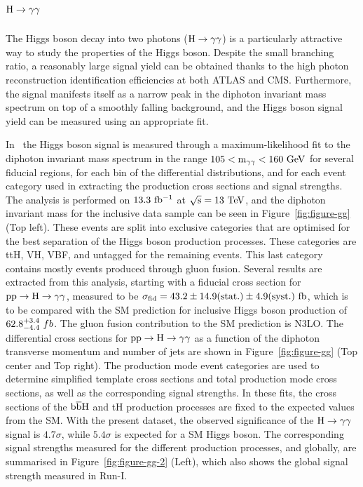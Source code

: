 \documentclass[10pt]{article}
\begin{document}
\section{\boldmath ${\rm H}\to\gamma\gamma$}

The Higgs boson decay into two photons (${\rm H\to\gamma\gamma}$) is a
particularly attractive way to study the properties of the Higgs boson. Despite
the small branching ratio, a reasonably large signal yield can be obtained thanks
to the high photon reconstruction identification efficiencies at both ATLAS and
CMS. Furthermore, the signal manifests itself as a narrow peak in the diphoton
invariant mass spectrum on top of a smoothly falling background, and the Higgs
boson signal yield can be measured using an appropriate fit.

In~\cite{ATLAS-gg} the Higgs boson signal is measured through a
maximum-likelihood fit to the diphoton invariant mass spectrum in the range
${\rm 105 < m_{\gamma\gamma} < 160~GeV}$ for several fiducial regions, for
each bin of the differential distributions, and for each event category used
in extracting the production cross sections and signal strengths. The analysis
is performed on ${\rm 13.3~fb^{-1}}$ at ${\rm \sqrt{s} = 13~TeV}$, and the
diphoton invariant mass for the inclusive data sample can be seen in
Figure~\ref{fig:figure-gg} (Top left). These events are split into exclusive
categories that are optimised for the best separation of the Higgs boson
production processes. These categories are ttH, VH, VBF, and untagged for the
remaining events. This last category contains mostly events produced through
gluon fusion. Several results are extracted from this analysis, starting with
a fiducial cross section for ${\rm pp\to H\to \gamma\gamma}$, measured to be
${\rm \sigma_{fid} = 43.2 \pm 14.9(stat.) \pm 4.9(syst.)~fb}$, which is to be
compared with the SM prediction for inclusive Higgs boson production of
${\rm 62.8_{-4.4}^{+3.4}}~fb$. The gluon fusion contribution to the SM
prediction is N3LO. The differential cross sections for ${\rm pp\to H\to \gamma\gamma}$
as a function of the diphoton transverse momentum and number of jets are shown
in Figure~\ref{fig:figure-gg} (Top center and Top right). The production mode
event categories are used to determine simplified template cross sections and
total production mode cross sections, as well as the corresponding signal
strengths. In these fits, the cross sections of the ${\rm b{\bar b}H}$ and tH
production processes are fixed to the expected values from the SM. With the
present dataset, the observed significance of the ${\rm H\to\gamma\gamma}$ signal
is $4.7\sigma$, while $5.4\sigma$ is expected for a SM Higgs boson. The corresponding
signal strengths measured for the different production processes, and globally,
are summarised in Figure~\ref{fig:figure-gg-2} (Left), which also shows the global
signal strength measured in Run-I.
\end{document}
